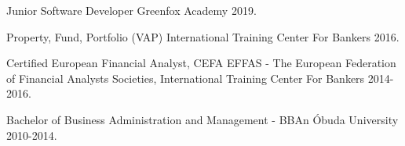 

\begin{cventries}

   \cventry
    {Junior Software Developer} %
    {Greenfox Academy} %
    {} %
    {2019.} %
    {
    } 
  \vspace{-2.0mm}
  
  \cventry
    {Property, Fund, Portfolio (VAP)} %
    {International Training Center For Bankers} %
    {} %
    {2016.} %
    {
    }
  \vspace{-2.0mm}
  
  \cventry
    {Certified European Financial Analyst, CEFA} %
    {EFFAS - The European Federation of Financial Analysts Societies, International Training Center For Bankers} %
    {} %
    {2014-2016.} %
    {
    }
  \vspace{-2.0mm}

  \cventry
    {Bachelor of Business Administration and Management - BBAn} %
    {Óbuda University} %
    {} %
    {2010-2014.} %
    {
    }
  \vspace{-2.0mm}


\end{cventries}
